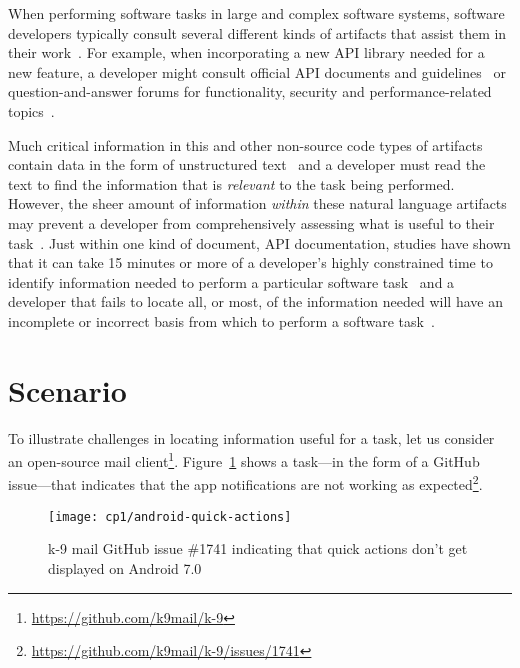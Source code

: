 

When performing software tasks in large and complex software systems, software developers typically consult several different kinds of artifacts that assist them in their work~\cite{Starke2009, Meyer2017}. For example, 
when incorporating a new API library needed for a new feature, a developer might consult official API documents and guidelines~\cite{robillard2011field, umarji2008archetypal} or 
 question-and-answer forums for functionality, security and performance-related topics~\cite{parnin2012, silva2019}.



Much critical information in this and other non-source code types of artifacts 
contain data in the form of unstructured text~\cite{Bavota2016} and 
a developer must read the text to find the information that is \textit{relevant} to the task being performed.
However, the sheer amount of information \textit{within} these natural language artifacts may prevent a developer from comprehensively assessing what is useful to their task~\cite{Murphy2005}. Just within one kind of document, API
documentation, studies have shown that it can take 15 minutes or more
of a developer's highly constrained time to identify 
information needed to perform a particular software task~\cite{endrikat2014, Meyer2017}
and a developer that fails to locate all, or most, of the information needed
 will have an incomplete or incorrect basis from which to perform a software task~\cite{Murphy2005}.





\section{Scenario}
\label{cp1:example}




To illustrate challenges in locating information useful for a task, let us consider an open-source mail client\footnote{\url{https://github.com/k9mail/k-9}}.
Figure~\ref{fig:android-notifications-task} shows a task---in the form of a GitHub issue---that indicates that the app notifications 
are not working as expected\footnote{\url{https://github.com/k9mail/k-9/issues/1741}}. 


\begin{figure}[h!]
    \centering
    \texttt{[image: cp1/android-quick-actions]}
    \caption{k-9 mail GitHub issue \#1741 indicating that quick actions don't get displayed on Android 7.0}
    \label{fig:android-notifications-task}
\end{figure}


